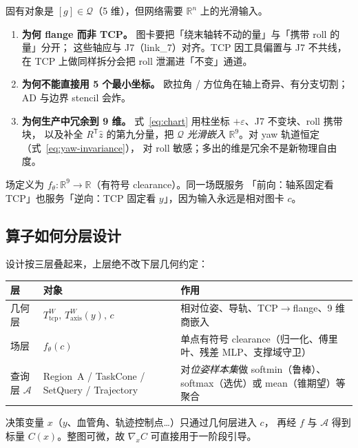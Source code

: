 \documentclass[UTF8,a4paper,11pt,fontset=fandol]{ctexart}
\newcommand{\R}{\mathbb{R}}
\newcommand{\Tcp}{T_{\mathrm{tcp}}}
\newcommand{\Taxis}{T_{\mathrm{axis}}}
\begin{document}
固有对象是 \([g]\in\mathcal{Q}\)（5 维），但网络需要 \(\R^{n}\) 上的光滑输入。

\begin{enumerate}[leftmargin=1.6em]
  \item \textbf{为何 flange 而非 TCP。}
        图卡要把「绕末轴转不动的量」与「携带 roll 的量」分开；
        这些轴应与 J7（link\_7）对齐。TCP 因工具偏置与 J7 不共线，
        在 TCP 上做同样拆分会把 roll 泄漏进「不变」通道。
  \item \textbf{为何不能直接用 5 个最小坐标。}
        欧拉角 / 方位角在轴上奇异、有分支切割；AD 与边界 stencil 会炸。
  \item \textbf{为何生产中冗余到 9 维。}
        式~\eqref{eq:chart} 用柱坐标 \(+\varepsilon\)、J7 不变块、roll 携带块，
        以及补全 \(R^{\mathsf T}\hat z\) 的第九分量，把 \(\mathcal{Q}\)
        \emph{光滑嵌入} \(\R^{9}\)。对 yaw 轨道恒定（式~\eqref{eq:yaw-invariance}），
        对 roll 敏感；多出的维是冗余不是新物理自由度。
\end{enumerate}

场定义为 \(f_{\theta}:\R^{9}\to\R\)（有符号 clearance）。同一场既服务
「前向：轴系固定看 TCP」也服务「逆向：TCP 固定看 \(y\)」，因为输入永远是相对图卡 \(c\)。

\subsection{算子如何分层设计}
\label{sec:operator-layers}

设计按三层叠起来，上层绝不改下层几何约定：

\begin{center}
\begin{tabular}{@{}llp{5.8cm}@{}}
\toprule
层 & 对象 & 作用 \\
\midrule
几何层
  & \(\Tcp^{W},\,\Taxis^{W}(y),\,c\)
  & 相对位姿、导轨、TCP\(\to\)flange、9 维商嵌入 \\
场层
  & \(f_{\theta}(c)\)
  & 单点有符号 clearance（归一化、傅里叶、残差 MLP、支撑域守卫） \\
查询层 \(\mathcal{A}\)
  & Region~A / TaskCone / SetQuery / Trajectory
  & 对\emph{位姿样本集}做 softmin（鲁棒）、softmax（选优）或 mean（锥期望）等聚合 \\
\bottomrule
\end{tabular}
\end{center}

决策变量 \(x\)（\(y\)、血管角、轨迹控制点\ldots）只通过几何层进入 \(c\)，
再经 \(f\) 与 \(\mathcal{A}\) 得到标量 \(C(x)\)。整图可微，故
\(\nabla_{x}C\) 可直接用于一阶段引导。
\end{document}

